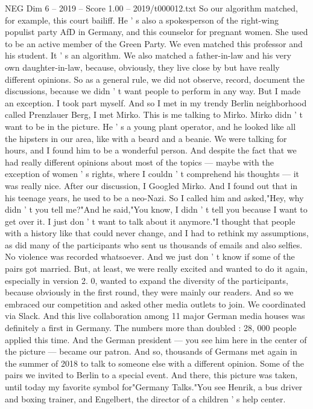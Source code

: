 \begin{textsample}{NEG Dim 6 – 2019 – Score 1.00 – 2019/t000012.txt}
So our algorithm matched, for example, this court bailiff.
He ' s also a spokesperson of the right-wing populist party AfD in Germany, and this counselor for pregnant women.
She used to be an active member of the Green Party.
We even matched this professor and his student.
It ' s an algorithm.
We also matched a father-in-law and his very own daughter-in-law, because, obviously, they live close by but have really different opinions.
So as a general rule, we did not observe, record, document the discussions, because we didn ' t want people to perform in any way.
But I made an exception.
I took part myself.
And so I met in my trendy Berlin neighborhood called Prenzlauer Berg, I met Mirko.
This is me talking to Mirko.
Mirko didn ' t want to be in the picture.
He ' s a young plant operator, and he looked like all the hipsters in our area, like with a beard and a beanie.
We were talking for hours, and I found him to be a wonderful person.
And despite the fact that we had really different opinions about most of the topics — maybe with the exception of women ' s rights, where I couldn ' t comprehend his thoughts — it was really nice.
After our discussion, I Googled Mirko.
And I found out that in his teenage years, he used to be a neo-Nazi.
So I called him and asked,"Hey, why didn ' t you tell me?"And he said,"You know, I didn ' t tell you because I want to get over it.
I just don ' t want to talk about it anymore."I thought that people with a history like that could never change, and I had to rethink my assumptions, as did many of the participants who sent us thousands of emails and also selfies.
No violence was recorded whatsoever.
And we just don ' t know if some of the pairs got married.
But, at least, we were really excited and wanted to do it again, especially in version 2. 0, wanted to expand the diversity of the participants, because obviously in the first round, they were mainly our readers.
And so we embraced our competition and asked other media outlets to join.
We coordinated via Slack.
And this live collaboration among 11 major German media houses was definitely a first in Germany.
The numbers more than doubled : 28, 000 people applied this time.
And the German president — you see him here in the center of the picture — became our patron.
And so, thousands of Germans met again in the summer of 2018 to talk to someone else with a different opinion.
Some of the pairs we invited to Berlin to a special event.
And there, this picture was taken, until today my favorite symbol for"Germany Talks."You see Henrik, a bus driver and boxing trainer, and Engelbert, the director of a children ' s help center.

\end{textsample}
